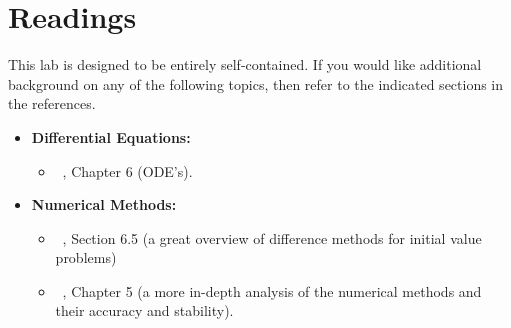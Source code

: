 % 
%
%
%
%
%
%
%
%
%

\section{Readings}

This lab is designed to be entirely self-contained.  
If you would like additional background on any of the following
topics, then refer to the indicated sections in the references.

\begin{itemize}
\item[\ ] \textbf{ Differential Equations:}  
  \begin{itemize}
  \item ~\cite{strang-am}, Chapter 6 (ODE's).
  \end{itemize}
\item[\ ] \textbf{ Numerical Methods:}
  \begin{itemize}
  \item ~\cite{strang-am}, Section 6.5 (a great overview of
    difference methods for initial value problems)
  \item ~\cite{burden-faires}, Chapter 5 (a more
    in-depth analysis of the numerical methods and their accuracy and
    stability).  
  \end{itemize}
\end{itemize}


